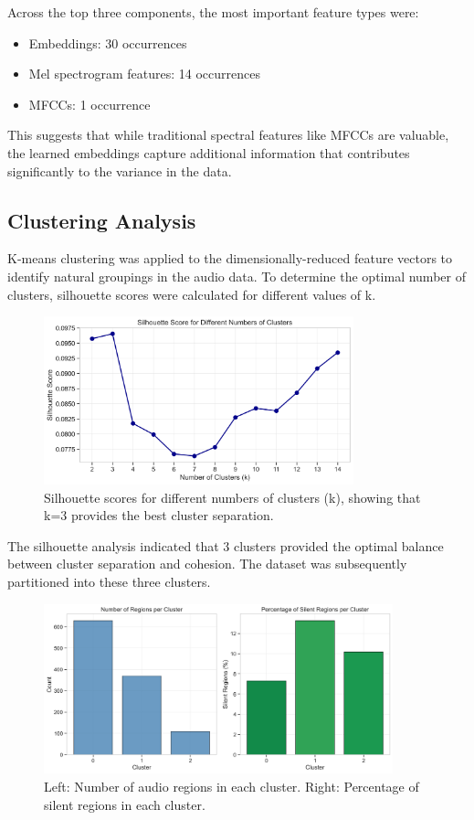 \documentclass{article}
\begin{document}
Across the top three components, the most important feature types were:
\begin{itemize}
    \item Embeddings: 30 occurrences
    \item Mel spectrogram features: 14 occurrences
    \item MFCCs: 1 occurrence
\end{itemize}

This suggests that while traditional spectral features like MFCCs are valuable, the learned embeddings capture additional information that contributes significantly to the variance in the data.

\subsection{Clustering Analysis}

K-means clustering was applied to the dimensionally-reduced feature vectors to identify natural groupings in the audio data. To determine the optimal number of clusters, silhouette scores were calculated for different values of k.

\begin{figure}[ht]
  \centering
  \includegraphics[width=0.8\textwidth]{figures/audio_features/silhouette_scores.png}
  \caption{Silhouette scores for different numbers of clusters (k), showing that k=3 provides the best cluster separation.}
  \label{fig:silhouette}
\end{figure}

The silhouette analysis indicated that 3 clusters provided the optimal balance between cluster separation and cohesion. The dataset was subsequently partitioned into these three clusters.

\begin{figure}[ht]
  \centering
  \includegraphics[width=0.9\textwidth]{figures/audio_features/cluster_composition.png}
  \caption{Left: Number of audio regions in each cluster. Right: Percentage of silent regions in each cluster.}
  \label{fig:cluster_comp}
\end{figure}
\end{document}
